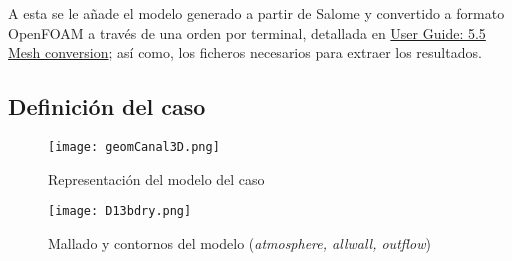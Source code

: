 A esta se le añade el modelo generado a partir de Salome y convertido a
formato OpenFOAM a través de una orden por terminal, detallada en
\href{https://cfd.direct/openfoam/user-guide/mesh-conversion/}{User
Guide: 5.5 Mesh conversion}; así como, los ficheros necesarios para
extraer los resultados.

\subsection{Definición del caso}\label{header-n18}

\begin{figure}
\centering
\texttt{[image: geomCanal3D.png]}
\caption{Representación del modelo del caso}
\label{fig:geomCanal3D}
\end{figure}

\begin{figure}
\centering
\texttt{[image: D13bdry.png]}
\caption{Mallado y contornos del modelo (\emph{atmosphere, allwall, outflow})}
\label{fig:D13bdry}
\end{figure}

